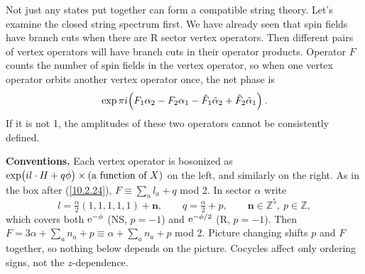 	Not just any states put together can form a compatible string theory. Let's examine the closed string spectrum first. We have already seen that spin fields have branch cuts when there are R sector vertex operators. Then different pairs of vertex operators will have branch cuts in their operator products. Operator $F$ counts the number of spin fields in the vertex operator, so when one vertex operator orbits another vertex operator once, the net phase is
	\begin{equation}
		\exp \pi i\Bigl(F_{1}\alpha_{2} - F_{2}\alpha_{1} - \tilde{F}_{1}\tilde{\alpha}_{2} +\tilde{F}_{2}\tilde{\alpha}_{1} \Bigr) \:. \label{10.6.4}
	\end{equation}
	If it is not 1, the amplitudes of these two operators cannot be consistently defined.
	\begin{tcolorbox}[breakable]
		\begin{remark}
			\textbf{Conventions.} Each vertex operator is bosonized as $\exp\bigl(i l\cdot H+q\phi\bigr)\times(\text{a function of }X)$ on the left, and similarly on the right. As in the box after (\ref{10.2.24}), $F\equiv\sum_al_a+q$ mod 2. In sector $\alpha$ write
			\begin{equation*}
				l=\tfrac{\alpha}{2}(1,1,1,1,1)+\mathbf n,\qquad q=\tfrac{\alpha}{2}+p,\qquad \mathbf n\in\mathds Z^{5},\ p\in\mathds Z ,
			\end{equation*}
			which covers both $\mathrm{e}^{-\phi}$ (NS, $p=-1$) and $\mathrm{e}^{-\phi/2}$ (R, $p=-1$). Then $F=3\alpha+\sum_a n_a+p\equiv\alpha+\sum_an_a+p$ mod 2. Picture changing shifts $p$ and $F$ together, so nothing below depends on the picture. Cocycles affect only ordering signs, not the $z$-dependence.


\end{remark}
\end{tcolorbox}
